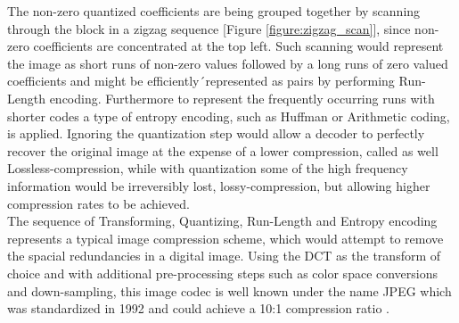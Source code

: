 \documentclass[a4paper,11pt,oneside]{article}
\begin{document}
The non-zero quantized coefficients are being grouped together by scanning through the block in a zigzag sequence [Figure \ref{figure:zigzag_scan}], since non-zero coefficients are concentrated at the top left. Such scanning would represent the image as short runs of non-zero values followed by a long runs of zero valued coefficients and might be efficiently´represented as pairs by performing Run-Length encoding. Furthermore to represent the frequently occurring runs with shorter codes a type of entropy encoding, such as Huffman or Arithmetic coding, is applied. Ignoring the quantization step would allow a decoder to perfectly recover the original image at the expense of a lower compression, called as well Lossless-compression, while with quantization some of the high frequency information would be irreversibly lost, lossy-compression, but allowing higher compression rates to be achieved. \\ 
\indent The sequence of Transforming, Quantizing, Run-Length and Entropy encoding represents a typical image compression scheme, which would attempt to remove the spacial redundancies in a digital image. Using the DCT as the transform of choice and with additional pre-processing steps such as color space conversions and down-sampling, this image codec is well known under the name JPEG which was standardized in 1992 and could achieve a 10:1 compression ratio \cite{jpeg_nasa}. \\
\end{document}
